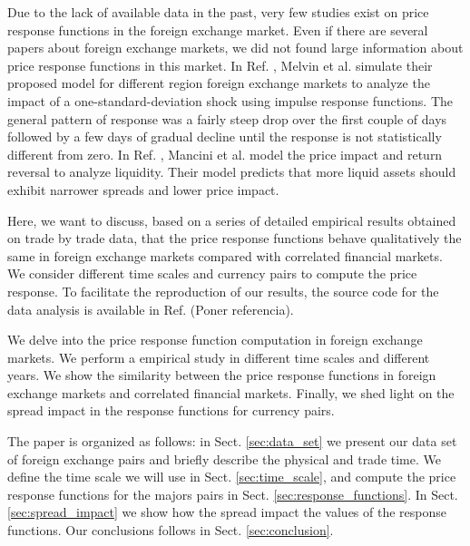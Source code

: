 Due to the lack of available data in the past, very few studies exist on price
response functions in the foreign exchange market. Even if there are several
papers about foreign exchange markets, we did not found large information about
price response functions in this market. In Ref. \cite{forex_volatility},
Melvin et al. simulate their proposed model for different region foreign
exchange markets to analyze the impact of a one-standard-deviation shock using
impulse response functions. The general pattern of response was a fairly steep
drop over the first couple of days followed by a few days of gradual decline
until the response is not statistically different from zero. In Ref.
\cite{forex_liquidity}, Mancini et al. model the price impact and return
reversal to analyze liquidity. Their model predicts that more liquid assets
should exhibit narrower spreads and lower price impact.

Here, we want to discuss, based on a series of detailed empirical results
obtained on trade by trade data, that the price response functions behave
qualitatively the same in foreign exchange markets compared with correlated
financial markets. We consider different time scales and currency pairs to
compute the price response. To facilitate the reproduction of our results, the
source code for the data analysis is available in Ref. (Poner referencia).

We delve into the price response function computation in foreign exchange
markets. We perform a empirical study in different time scales and different
years. We show the similarity between the price response functions in foreign
exchange markets and correlated financial markets. Finally, we shed light on
the spread impact in the response functions for currency pairs.

The paper is organized as follows: in Sect. \ref{sec:data_set} we present our
data set of foreign exchange pairs and briefly describe the physical and trade
time. We define the time scale we will use in Sect. \ref{sec:time_scale}, and
compute the price response functions for the majors pairs in Sect.
\ref{sec:response_functions}. In Sect. \ref{sec:spread_impact} we show how
the spread impact the values of the response functions. Our conclusions follows
in Sect. \ref{sec:conclusion}.
